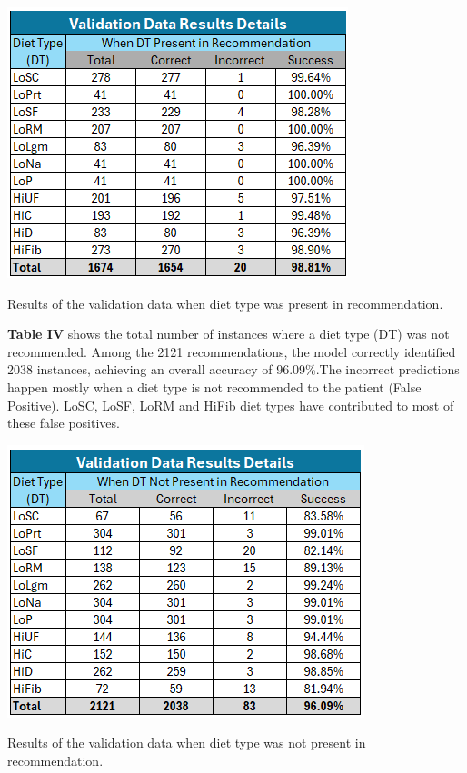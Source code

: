 \begin{table}[H]
    \centering
    \includegraphics[width=\linewidth]{Figures/vdrdp.png}
    \caption{Results of the validation data when diet type was present in recommendation.}
\end{table}

\textbf{Table IV} shows the total number of instances where a diet type (DT) was not recommended. Among the 2121 recommendations, the model correctly identified 2038 instances, achieving an overall accuracy of 96.09\%.The incorrect predictions happen mostly when a diet type is not recommended to the patient (False Positive). LoSC, LoSF, LoRM and HiFib diet types have contributed to most of these false positives.


\begin{table}[H]
    \centering
    \includegraphics[width=\linewidth]{Figures/vdrdn.png}
    \caption{Results of the validation data when diet type was not present in recommendation.}
\end{table}


